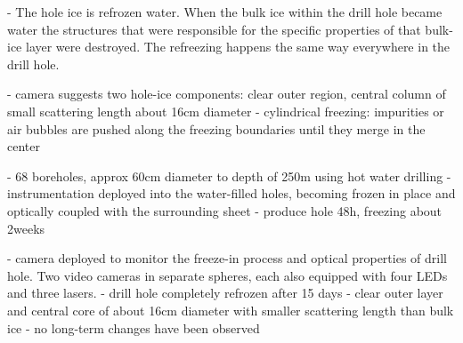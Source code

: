 - The hole ice is refrozen water. When the bulk ice within the drill hole became water the structures that were responsible for the specific properties of that bulk-ice layer were destroyed. The refreezing happens the same way everywhere in the drill hole.

- camera suggests two hole-ice components: clear outer region, central column of small scattering length about 16cm diameter \cite{rongenswedishcamera,instrumentation}
- cylindrical freezing: impurities or air bubbles are pushed along the freezing boundaries until they merge in the center \cite{rongenswedishcamera}

- 68 boreholes, approx 60cm diameter to depth of 250m using hot water drilling\cite{instrumentation}
- instrumentation deployed into the water-filled holes, becoming frozen in place and optically coupled with the surrounding sheet \cite{instrumentation}
- produce hole 48h, freezing about 2weeks \cite{instrumentation}

- camera deployed to monitor the freeze-in process and optical properties of drill hole. Two video cameras in separate spheres, each also equipped with four LEDs and three lasers. \cite{instrumentation}
- drill hole completely refrozen after 15 days \cite{instrumentation}
- clear outer layer and central core of about 16cm diameter with smaller scattering length than bulk ice\cite{instrumentation}
- no long-term changes have been observed \cite{instrumentation}

